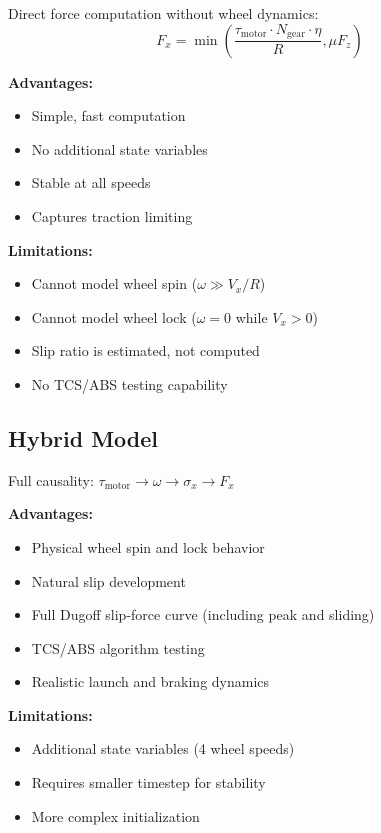 \documentclass[11pt,a4paper]{article}
\begin{document}
Direct force computation without wheel dynamics:
\begin{equation}
F_x = \min\left( \frac{\tau_{\text{motor}} \cdot N_{\text{gear}} \cdot \eta}{R}, \mu F_z \right)
\end{equation}

\textbf{Advantages:}
\begin{itemize}
    \item Simple, fast computation
    \item No additional state variables
    \item Stable at all speeds
    \item Captures traction limiting
\end{itemize}

\textbf{Limitations:}
\begin{itemize}
    \item Cannot model wheel spin ($\omega \gg V_x/R$)
    \item Cannot model wheel lock ($\omega = 0$ while $V_x > 0$)
    \item Slip ratio is estimated, not computed
    \item No TCS/ABS testing capability
\end{itemize}

\subsection{Hybrid Model}

Full causality: $\tau_{\text{motor}} \rightarrow \omega \rightarrow \sigma_x \rightarrow F_x$

\textbf{Advantages:}
\begin{itemize}
    \item Physical wheel spin and lock behavior
    \item Natural slip development
    \item Full Dugoff slip-force curve (including peak and sliding)
    \item TCS/ABS algorithm testing
    \item Realistic launch and braking dynamics
\end{itemize}

\textbf{Limitations:}
\begin{itemize}
    \item Additional state variables (4 wheel speeds)
    \item Requires smaller timestep for stability
    \item More complex initialization
\end{itemize}
\end{document}
